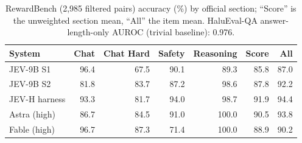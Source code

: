 \begin{table}[t]
\centering\small
\caption{RewardBench (2{,}985 filtered pairs) accuracy (\%) by official section; ``Score'' is the unweighted section mean, ``All'' the item mean. HaluEval-QA answer-length-only AUROC (trivial baseline): 0.976.}
\label{tab:judgetrack}
\begin{tabular}{@{}lrrrrrr@{}}
\toprule
System & Chat & Chat Hard & Safety & Reasoning & Score & All \\
\midrule
JEV-9B S1 & 96.4 & 67.5 & 90.1 & 89.3 & 85.8 & 87.0 \\
JEV-9B S2 & 81.8 & 83.7 & 87.2 & 98.6 & 87.8 & 92.2 \\
JEV-H harness & 93.3 & 81.7 & 94.0 & 98.7 & 91.9 & 94.4 \\
Astra (high) & 86.7 & 84.5 & 91.0 & 100.0 & 90.5 & 93.8 \\
Fable (high) & 96.7 & 87.3 & 71.4 & 100.0 & 88.9 & 90.2 \\
\bottomrule
\end{tabular}
\end{table}
